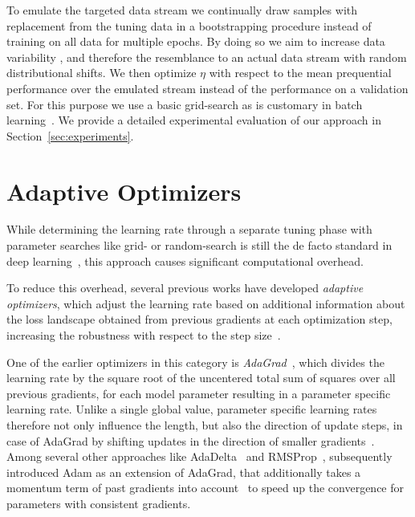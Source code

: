 \documentclass[letterpaper]{article} %
\begin{document}
To emulate
the targeted data stream we continually draw samples with replacement from the tuning data in a bootstrapping procedure instead of training on all data for multiple epochs.
By doing so we aim to increase data variability%
, and therefore the resemblance to an actual data stream with random distributional shifts.
We then optimize $\eta$ with respect to the mean prequential performance over the emulated stream instead of the performance on a validation set.
For this purpose we use a basic grid-search as is customary in batch learning~\cite{defazioLearningRateFreeLearningDAdaptation2023a}.
We provide a detailed experimental evaluation of our approach in Section~\ref{sec:experiments}.


\section{Adaptive Optimizers}

While determining the learning rate through a separate tuning phase with parameter searches like grid- or random-search is still the de facto standard in deep learning~\cite{defazioLearningRateFreeLearningDAdaptation2023a}, this approach causes significant computational overhead.

To reduce this overhead, several previous works have developed \textit{adaptive optimizers}, which adjust the learning rate based on additional information about the loss landscape obtained from previous gradients at each optimization step, increasing the robustness with respect to the step size~\cite{duchiAdaptiveSubgradientMethods2011}.

One of the earlier optimizers in this category is \textit{AdaGrad}~\cite{duchiAdaptiveSubgradientMethods2011}, which divides the learning rate by the square root of the uncentered total sum of squares over all previous gradients, for each model parameter resulting in a parameter specific learning rate.
Unlike a single global value, parameter specific learning rates therefore not only influence the length, but also the direction of update steps, in case of AdaGrad by shifting updates in the direction of smaller gradients~\cite{wuWNGradLearnLearning2020}. %
Among several other approaches like AdaDelta~\cite[see e.g.]{zeilerADADELTAAdaptiveLearning2012a} and RMSProp~\cite{tielemanLecture5rmspropDivide2012}, \citet{kingmaAdamMethodStochastic2017b} subsequently introduced Adam as an extension of AdaGrad, that additionally takes a momentum term of past gradients into account~\cite[see]{sutskeverImportanceInitializationMomentum2013} to speed up the convergence for parameters with consistent gradients.
\end{document}
